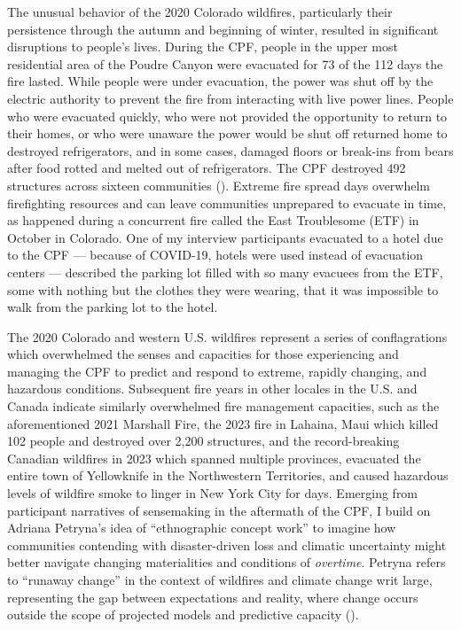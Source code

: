 \documentclass[
]{article}
\begin{document}
The unusual behavior of the 2020 Colorado wildfires, particularly their persistence through the autumn and beginning of winter, resulted in significant disruptions to people's lives. During the CPF, people in the upper most residential area of the Poudre Canyon were evacuated for 73 of the 112 days the fire lasted. While people were under evacuation, the power was shut off by the electric authority to prevent the fire from interacting with live power lines. People who were evacuated quickly, who were not provided the opportunity to return to their homes, or who were unaware the power would be shut off returned home to destroyed refrigerators, and in some cases, damaged floors or break-ins from bears after food rotted and melted out of refrigerators. The CPF destroyed 492 structures across sixteen communities (). Extreme fire spread days overwhelm firefighting resources and can leave communities unprepared to evacuate in time, as happened during a concurrent fire called the East Troublesome (ETF) in October in Colorado. One of my interview participants evacuated to a hotel due to the CPF --- because of COVID-19, hotels were used instead of evacuation centers --- described the parking lot filled with so many evacuees from the ETF, some with nothing but the clothes they were wearing, that it was impossible to walk from the parking lot to the hotel.

The 2020 Colorado and western U.S. wildfires represent a series of conflagrations which overwhelmed the senses and capacities for those experiencing and managing the CPF to predict and respond to extreme, rapidly changing, and hazardous conditions. Subsequent fire years in other locales in the U.S. and Canada indicate similarly overwhelmed fire management capacities, such as the aforementioned 2021 Marshall Fire, the 2023 fire in Lahaina, Maui which killed 102 people and destroyed over 2,200 structures, and the record-breaking Canadian wildfires in 2023 which spanned multiple provinces, evacuated the entire town of Yellowknife in the Northwestern Territories, and caused hazardous levels of wildfire smoke to linger in New York City for days. Emerging from participant narratives of sensemaking in the aftermath of the CPF, I build on Adriana Petryna's idea of ``ethnographic concept work'' to imagine how communities contending with disaster-driven loss and climatic uncertainty might better navigate changing materialities and conditions of \emph{overtime}. Petryna refers to ``runaway change'' in the context of wildfires and climate change writ large, representing the gap between expectations and reality, where change occurs outside the scope of projected models and predictive capacity ().
\end{document}
